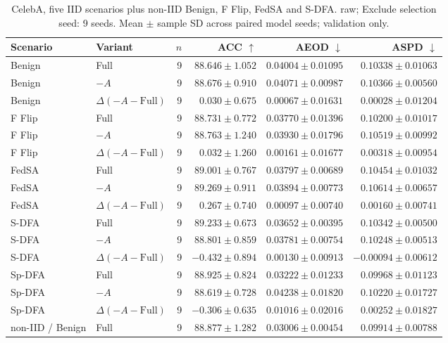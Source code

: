 \begin{table}[t]
\centering
\small
\caption{CelebA, five IID scenarios plus non-IID Benign, F Flip, FedSA and S-DFA. raw; Exclude selection seed: 9 seeds. Mean $\pm$ sample SD across paired model seeds; validation only.}
\begin{tabular}{llrrrr}
\toprule
Scenario & Variant & $n$ & ACC $\uparrow$ & AEOD $\downarrow$ & ASPD $\downarrow$ \\
\midrule
Benign & Full & 9 & $88.646 \pm 1.052$ & $0.04004 \pm 0.01095$ & $0.10338 \pm 0.01063$ \\
Benign & $-A$ & 9 & $88.676 \pm 0.910$ & $0.04071 \pm 0.00987$ & $0.10366 \pm 0.00560$ \\
Benign & $\Delta(-A-\mathrm{Full})$ & 9 & $0.030 \pm 0.675$ & $0.00067 \pm 0.01631$ & $0.00028 \pm 0.01204$ \\
F Flip & Full & 9 & $88.731 \pm 0.772$ & $0.03770 \pm 0.01396$ & $0.10200 \pm 0.01017$ \\
F Flip & $-A$ & 9 & $88.763 \pm 1.240$ & $0.03930 \pm 0.01796$ & $0.10519 \pm 0.00992$ \\
F Flip & $\Delta(-A-\mathrm{Full})$ & 9 & $0.032 \pm 1.260$ & $0.00161 \pm 0.01677$ & $0.00318 \pm 0.00954$ \\
FedSA & Full & 9 & $89.001 \pm 0.767$ & $0.03797 \pm 0.00689$ & $0.10454 \pm 0.01032$ \\
FedSA & $-A$ & 9 & $89.269 \pm 0.911$ & $0.03894 \pm 0.00773$ & $0.10614 \pm 0.00657$ \\
FedSA & $\Delta(-A-\mathrm{Full})$ & 9 & $0.267 \pm 0.740$ & $0.00097 \pm 0.00740$ & $0.00160 \pm 0.00741$ \\
S-DFA & Full & 9 & $89.233 \pm 0.673$ & $0.03652 \pm 0.00395$ & $0.10342 \pm 0.00500$ \\
S-DFA & $-A$ & 9 & $88.801 \pm 0.859$ & $0.03781 \pm 0.00754$ & $0.10248 \pm 0.00513$ \\
S-DFA & $\Delta(-A-\mathrm{Full})$ & 9 & $-0.432 \pm 0.894$ & $0.00130 \pm 0.00913$ & $-0.00094 \pm 0.00612$ \\
Sp-DFA & Full & 9 & $88.925 \pm 0.824$ & $0.03222 \pm 0.01233$ & $0.09968 \pm 0.01123$ \\
Sp-DFA & $-A$ & 9 & $88.619 \pm 0.728$ & $0.04238 \pm 0.01820$ & $0.10220 \pm 0.01727$ \\
Sp-DFA & $\Delta(-A-\mathrm{Full})$ & 9 & $-0.306 \pm 0.635$ & $0.01016 \pm 0.02016$ & $0.00252 \pm 0.01827$ \\
non-IID / Benign & Full & 9 & $88.877 \pm 1.282$ & $0.03006 \pm 0.00454$ & $0.09914 \pm 0.00788$ \\

\end{tabular}
\end{table}
